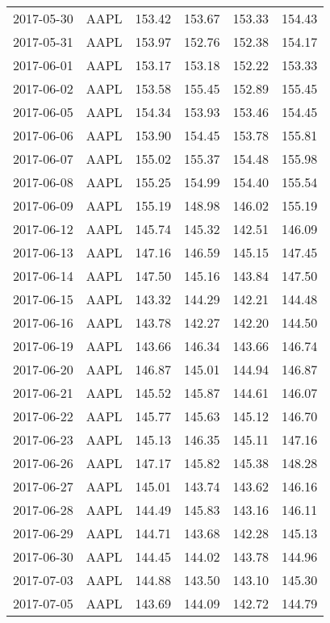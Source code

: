 \documentclass[a4paper, 12pt]{report}
\begin{document}
\begin{appendices}
\begin{longtable}{llllll}
  2017-05-30 & AAPL & 153.42 & 153.67 & 153.33 & 154.43 \\ 
  2017-05-31 & AAPL & 153.97 & 152.76 & 152.38 & 154.17 \\ 
  2017-06-01 & AAPL & 153.17 & 153.18 & 152.22 & 153.33 \\ 
  2017-06-02 & AAPL & 153.58 & 155.45 & 152.89 & 155.45 \\ 
  2017-06-05 & AAPL & 154.34 & 153.93 & 153.46 & 154.45 \\ 
  2017-06-06 & AAPL & 153.90 & 154.45 & 153.78 & 155.81 \\ 
  2017-06-07 & AAPL & 155.02 & 155.37 & 154.48 & 155.98 \\ 
  2017-06-08 & AAPL & 155.25 & 154.99 & 154.40 & 155.54 \\ 
  2017-06-09 & AAPL & 155.19 & 148.98 & 146.02 & 155.19 \\ 
  2017-06-12 & AAPL & 145.74 & 145.32 & 142.51 & 146.09 \\ 
  2017-06-13 & AAPL & 147.16 & 146.59 & 145.15 & 147.45 \\ 
  2017-06-14 & AAPL & 147.50 & 145.16 & 143.84 & 147.50 \\ 
  2017-06-15 & AAPL & 143.32 & 144.29 & 142.21 & 144.48 \\ 
  2017-06-16 & AAPL & 143.78 & 142.27 & 142.20 & 144.50 \\ 
  2017-06-19 & AAPL & 143.66 & 146.34 & 143.66 & 146.74 \\ 
  2017-06-20 & AAPL & 146.87 & 145.01 & 144.94 & 146.87 \\ 
  2017-06-21 & AAPL & 145.52 & 145.87 & 144.61 & 146.07 \\ 
  2017-06-22 & AAPL & 145.77 & 145.63 & 145.12 & 146.70 \\ 
  2017-06-23 & AAPL & 145.13 & 146.35 & 145.11 & 147.16 \\ 
  2017-06-26 & AAPL & 147.17 & 145.82 & 145.38 & 148.28 \\ 
  2017-06-27 & AAPL & 145.01 & 143.74 & 143.62 & 146.16 \\ 
  2017-06-28 & AAPL & 144.49 & 145.83 & 143.16 & 146.11 \\ 
  2017-06-29 & AAPL & 144.71 & 143.68 & 142.28 & 145.13 \\ 
  2017-06-30 & AAPL & 144.45 & 144.02 & 143.78 & 144.96 \\ 
  2017-07-03 & AAPL & 144.88 & 143.50 & 143.10 & 145.30 \\ 
  2017-07-05 & AAPL & 143.69 & 144.09 & 142.72 & 144.79 \\ 

\end{longtable}
\end{appendices}
\end{document}
